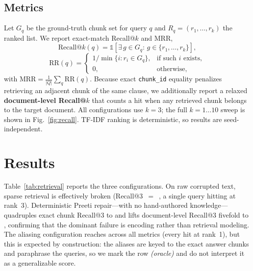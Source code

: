 \documentclass[conference]{IEEEtran}
\begin{document}
\subsection{Metrics}
Let $G_q$ be the ground-truth chunk set for query $q$ and $R_q=(r_1,\ldots,r_k)$ the ranked list. We report exact-match Recall@$k$ and MRR,
\begin{equation}
\mathrm{Recall@}k(q)=\mathbb{1}\!\left[\exists\, g\in G_q:\, g\in\{r_1,\ldots,r_k\}\right],
\end{equation}
\begin{equation}
\mathrm{RR}(q)=\begin{cases}1/\min\{i:r_i\in G_q\}, & \text{if such }i\text{ exists},\\ 0, & \text{otherwise},\end{cases}
\end{equation}
with $\mathrm{MRR}=\frac{1}{|Q|}\sum_q \mathrm{RR}(q)$. Because exact \texttt{chunk\_id} equality penalizes retrieving an adjacent chunk of the same clause, we additionally report a relaxed \textbf{document-level Recall@$k$} that counts a hit when any retrieved chunk belongs to the target document. All configurations use $k{=}3$; the full $k{=}1\ldots10$ sweep is shown in Fig.~\ref{fig:recall}. TF-IDF ranking is deterministic, so results are seed-independent.

\section{Results}
Table~\ref{tab:retrieval} reports the three configurations. On raw corrupted text, sparse retrieval is effectively broken (Recall@3~$=$~\rawRecall{}, a single query hitting at rank~3). Deterministic Preeti repair---with no hand-authored knowledge---quadruples exact chunk Recall@3 to \repRecall{} and lifts document-level Recall@3 fivefold to \repDocRecall{}, confirming that the dominant failure is encoding rather than retrieval modeling. The aliasing configuration reaches \aliRecall{} across all metrics (every hit at rank~1), but this is expected by construction: the aliases are keyed to the exact answer chunks and paraphrase the queries, so we mark the row \emph{(oracle)} and do not interpret it as a generalizable score.

\begin{table}[t]
\caption{Retrieval accuracy on the 11-query code-switched bank ($k{=}3$). Aliased row is an oracle upper bound (leakage), shown in italics.}
\label{tab:retrieval}
\centering

\end{table}
\end{document}
